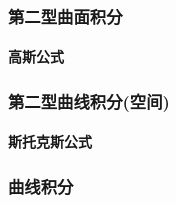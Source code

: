﻿\documentclass[a4paper,12pt,UTF8]{ctexart}
\begin{document}
    \subsubsection{第二型曲面积分}

    \paragraph{高斯公式}

    \subsubsection{第二型曲线积分(空间)}

    \paragraph{斯托克斯公式}
    
    \subsubsection{曲线积分}
\end{document}
